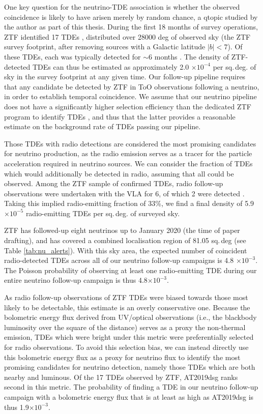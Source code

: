 One key question for the neutrino-TDE association is whether the observed coincidence is likely to have arisen merely by random chance, a qtopic studied by the author as part of this thesis. During the first 18 months of survey operations, ZTF identified 17 TDEs \cite{van_velzen_20}, distributed over 28000 deg of observed sky (the ZTF survey footprint, after removing sources with a Galactic latitude $|b|<7$). Of these TDEs, each was typically detected for $\sim$6 months \cite{van_velzen_20}. The density of ZTF-detected TDEs can thus be estimated as approximately 2.0 $\times 10^{-4}$ per sq.\,deg. of sky in the survey footprint at any given time. Our follow-up pipeline requires that any candidate be detected by ZTF in ToO observations following a neutrino, in order to establish temporal coincidence. We assume that our neutrino pipeline does not have a significantly higher selection efficiency than the dedicated ZTF program to identify TDEs \cite{van_velzen_20}, and thus that the latter provides a reasonable estimate on the background rate of TDEs passing our pipeline.

Those TDEs with radio detections are considered the most promising candidates for neutrino production, as the radio emission serves as a tracer for the particle acceleration required in neutrino sources. We can consider the fraction of TDEs which would additionally be detected in radio, assuming that all could be observed. Among the ZTF sample of confirmed TDEs, radio follow-up observations were undertaken with the VLA for 6, of which 2 were detected \cite{bran}. Taking this implied radio-emitting fraction of 33\%, we find a final density of 5.9 $\times 10^{-5}$ radio-emitting TDEs per sq.\,deg. of surveyed sky. 

ZTF has followed-up eight neutrinos up to January 2020 (the time of paper drafting), and has covered a combined localisation region of 81.05 sq.\,deg (see Table \ref{tab:nu_alerts}). With this sky area, the expected number of coincident radio-detected TDEs across all of our neutrino follow-up campaigns is 4.8 $\times 10^{-3}$. The Poisson probability of observing at least one radio-emitting TDE during our entire neutrino follow-up campaign is thus 4.8$ \times 10^{-3}$. 

As radio follow-up observations of ZTF TDEs were biased towards those most likely to be detectable, this estimate is an overly conservative one. Because the bolometric energy flux derived from UV/optical observations (i.e., the blackbody luminosity over the square of the distance) serves as a proxy the non-thermal emission, TDEs which were bright under this metric were preferentially selected for radio observations. To avoid this selection bias, we can instead directly use this bolometric energy flux  as a proxy for neutrino flux to identify the most promising candidates for neutrino detection, namely those TDEs which are both nearby and luminous. Of the 17 TDEs observed by ZTF, AT2019dsg ranks second in this metric. The probability of finding a TDE in our neutrino follow-up campaign with a bolometric energy flux that is at least as high as AT2019dsg is thus 1.9$ \times 10^{-3}$. 

